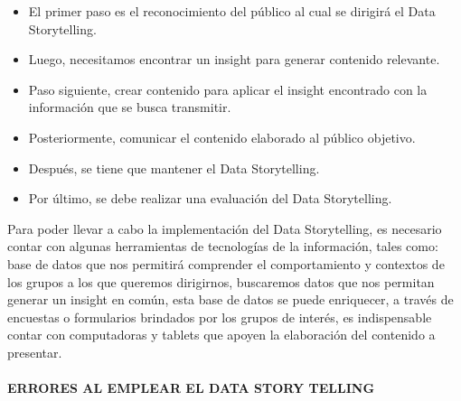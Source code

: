 \documentclass[preprint,12pt]{elsarticle}
\begin{document}
	\begin{itemize}
		\item El primer paso es el reconocimiento del público al cual se dirigirá el Data Storytelling.
		\item Luego, necesitamos encontrar un insight para generar contenido relevante.
		\item Paso siguiente, crear contenido para aplicar el insight encontrado con la información que se busca transmitir.
		\item Posteriormente, comunicar el contenido elaborado al público objetivo.
		\item Después, se tiene que mantener el Data Storytelling.
		\item Por último, se debe realizar una evaluación del Data Storytelling.
	\end{itemize}
	Para poder llevar a cabo la implementación del Data Storytelling, es necesario contar con algunas herramientas de tecnologías de la información, tales como: base de datos que nos permitirá comprender el comportamiento y contextos de los grupos a los que queremos dirigirnos, buscaremos datos que nos permitan generar un insight en común, esta base de datos se puede enriquecer, a través de encuestas o formularios brindados por los grupos de interés, es indispensable contar con computadoras y tablets que apoyen la elaboración del contenido a presentar.\\
	\\
	\textbf{ERRORES AL EMPLEAR EL DATA STORY TELLING}\\
	
\end{document}
